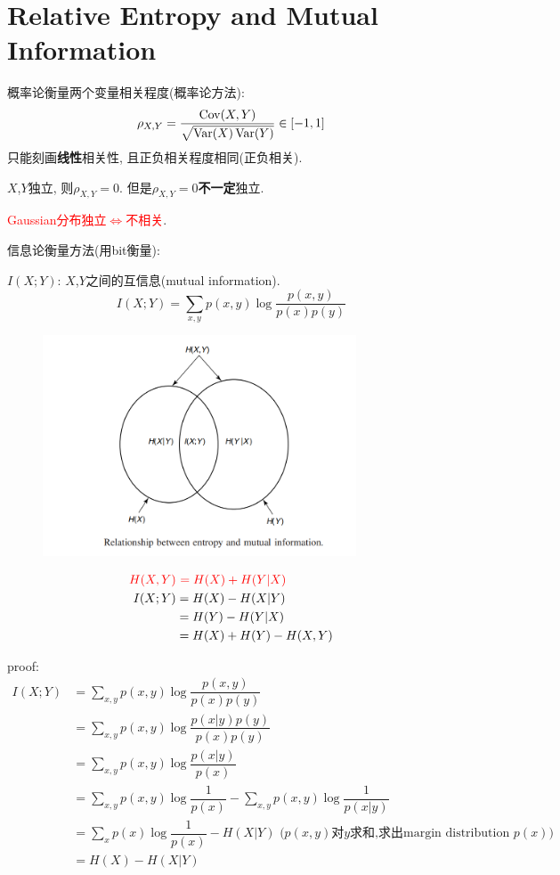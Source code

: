 \section{Relative Entropy and Mutual Information}
概率论衡量两个变量相关程度(概率论方法):
$$\rho_{X,Y}=\dfrac{\operatorname{Cov}(X,Y)}{\sqrt{\operatorname{Var}(X)\operatorname{Var}(Y)}}\in[-1,1]$$
只能刻画\textbf{线性}相关性, 且正负相关程度相同(正负相关).

\begin{proposition}
$X$,$Y$独立, 则$\rho_{X,Y}=0$. 但是$\rho_{X,Y}=0$\textbf{不一定}独立.

\textcolor{red}{Gaussian分布独立$\Leftrightarrow$不相关}.
\end{proposition}

信息论衡量方法(用bit衡量):
\begin{definition}
$I(X;Y)$: $X$,$Y$之间的互信息(mutual information).
$$I(X;Y)=\sum_{x,y}p(x,y)\log\dfrac{p(x,y)}{p(x)p(y)}$$
\end{definition}

\begin{figure}[htbp]
    \centering
    \includegraphics[width=0.83\textwidth]{./figures/chapter1/entropy_mutual_imformation.png}
\end{figure}

\begin{align*}
\textcolor{red}{H(X,Y)} &\ \textcolor{red}{= H(X) + H(Y|X)} \\
I(X;Y) &= H(X) - H(X|Y) \\
&= H(Y) - H(Y|X) \\
&= H(X) + H(Y) - H(X,Y)
\end{align*}

proof:
\begin{align*}
I(X;Y) &= \sum_{x,y}p(x,y)\log\dfrac{p(x,y)}{p(x)p(y)} \\
&= \sum_{x,y}p(x,y)\log\dfrac{p(x|y)p(y)}{p(x)p(y)} \\
&= \sum_{x,y}p(x,y)\log\dfrac{p(x|y)}{p(x)} \\
&= \sum_{x,y}p(x,y)\log\dfrac{1}{p(x)} - \sum_{x,y}p(x,y)\log\dfrac{1}{p(x|y)} \\
&= \sum_{x}p(x)\log\dfrac{1}{p(x)} - H(X|Y) \text{\ \ ($p(x,y)$对$y$求和,求出margin distribution $p(x)$)}\\
&= H(X) - H(X|Y)
\end{align*}

